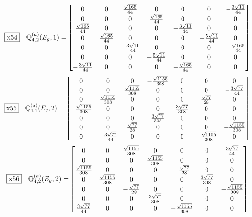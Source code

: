 \documentclass[fleqn,10pt,landscape]{jsarticle}
\begin{document}
\begin{dmath*}
\fbox{x54}\quad \mathbb{Q}_{4,2}^{(a)}(E_{g},1)=\begin{bmatrix} 0 & 0 & \frac{\sqrt{165}}{44} & 0 & 0 & 0 & - \frac{3 \sqrt{11}}{44} \\ 0 & 0 & 0 & \frac{\sqrt{165}}{44} & 0 & 0 & 0 \\ \frac{\sqrt{165}}{44} & 0 & 0 & 0 & - \frac{3 \sqrt{11}}{44} & 0 & 0 \\ 0 & \frac{\sqrt{165}}{44} & 0 & 0 & 0 & - \frac{5 \sqrt{11}}{44} & 0 \\ 0 & 0 & - \frac{3 \sqrt{11}}{44} & 0 & 0 & 0 & - \frac{\sqrt{165}}{44} \\ 0 & 0 & 0 & - \frac{5 \sqrt{11}}{44} & 0 & 0 & 0 \\ - \frac{3 \sqrt{11}}{44} & 0 & 0 & 0 & - \frac{\sqrt{165}}{44} & 0 & 0 \end{bmatrix}
\end{dmath*}
\begin{dmath*}
\fbox{x55}\quad \mathbb{Q}_{4,1}^{(a)}(E_{g},2)=\begin{bmatrix} 0 & 0 & 0 & - \frac{\sqrt{1155}}{308} & 0 & 0 & 0 \\ 0 & 0 & \frac{\sqrt{1155}}{308} & 0 & 0 & 0 & - \frac{3 \sqrt{77}}{44} \\ 0 & \frac{\sqrt{1155}}{308} & 0 & 0 & 0 & \frac{\sqrt{77}}{28} & 0 \\ - \frac{\sqrt{1155}}{308} & 0 & 0 & 0 & \frac{3 \sqrt{77}}{308} & 0 & 0 \\ 0 & 0 & 0 & \frac{3 \sqrt{77}}{308} & 0 & 0 & 0 \\ 0 & 0 & \frac{\sqrt{77}}{28} & 0 & 0 & 0 & - \frac{\sqrt{1155}}{308} \\ 0 & - \frac{3 \sqrt{77}}{44} & 0 & 0 & 0 & - \frac{\sqrt{1155}}{308} & 0 \end{bmatrix}
\end{dmath*}
\begin{dmath*}
\fbox{x56}\quad \mathbb{Q}_{4,2}^{(a)}(E_{g},2)=\begin{bmatrix} 0 & 0 & \frac{\sqrt{1155}}{308} & 0 & 0 & 0 & \frac{3 \sqrt{77}}{44} \\ 0 & 0 & 0 & \frac{\sqrt{1155}}{308} & 0 & 0 & 0 \\ \frac{\sqrt{1155}}{308} & 0 & 0 & 0 & - \frac{\sqrt{77}}{28} & 0 & 0 \\ 0 & \frac{\sqrt{1155}}{308} & 0 & 0 & 0 & \frac{3 \sqrt{77}}{308} & 0 \\ 0 & 0 & - \frac{\sqrt{77}}{28} & 0 & 0 & 0 & - \frac{\sqrt{1155}}{308} \\ 0 & 0 & 0 & \frac{3 \sqrt{77}}{308} & 0 & 0 & 0 \\ \frac{3 \sqrt{77}}{44} & 0 & 0 & 0 & - \frac{\sqrt{1155}}{308} & 0 & 0 \end{bmatrix}
\end{dmath*}
\end{document}
